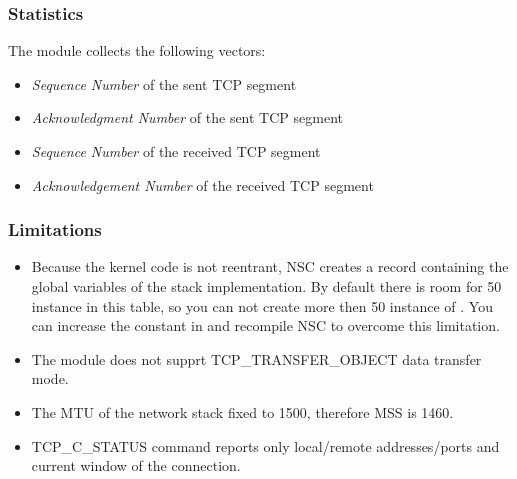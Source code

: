 \subsubsection*{Statistics}

The  module collects the following vectors:

\begin{itemize}
  \item {} \emph{Sequence Number} of the sent TCP segment
  \item {} \emph{Acknowledgment Number} of the sent TCP segment
  \item {} \emph{Sequence Number} of the received TCP segment
  \item {} \emph{Acknowledgement Number} of the received TCP segment
\end{itemize}

\subsubsection*{Limitations}

\begin{itemize}
\item Because the kernel code is not reentrant, NSC creates a record containing
the global variables of the stack implementation. By default there is room
for 50 instance in this table, so you can not create more then 50 instance
of . You can increase the  constant
in  and recompile NSC to overcome this limitation.

\item The  module does not supprt TCP\_TRANSFER\_OBJECT
data transfer mode.

\item The MTU of the network stack fixed to 1500, therefore MSS is 1460.

\item TCP\_C\_STATUS command reports only local/remote addresses/ports and
      current window of the connection.

\end{itemize}



